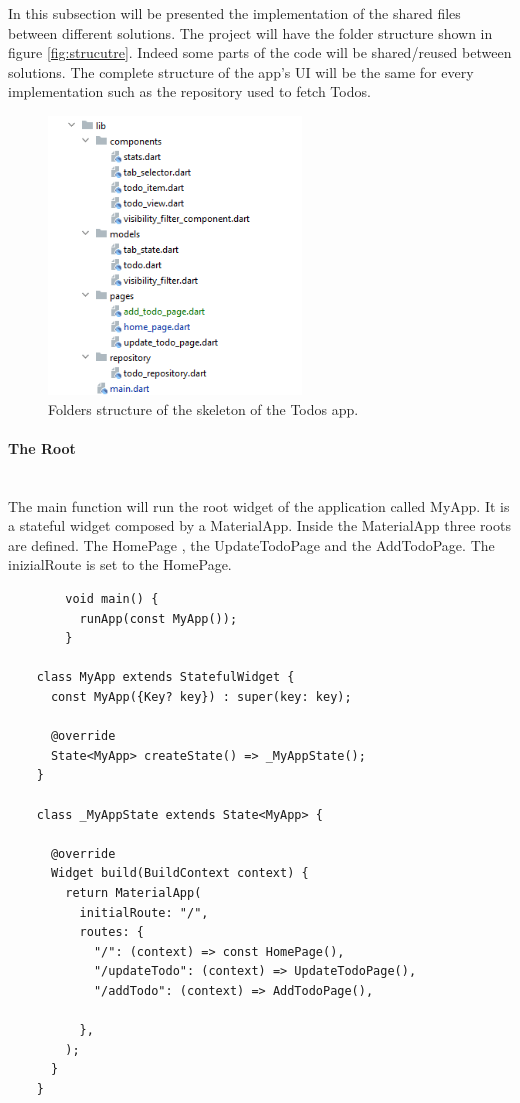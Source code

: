 	
	In this subsection will be presented the implementation of the shared files between different solutions. The project will have the folder structure shown in figure \ref{fig:strucutre}. Indeed some parts of the code will be shared/reused between solutions. The complete structure of the app’s UI will be the same for every implementation such as the repository used to fetch Todos. 
		
		\begin{figure}[H]
		    \centering
		    \includegraphics[width=0.6\textwidth]{Images/folder_structure.png}
		    \caption{Folders structure of the skeleton of the Todos app.}
		    \label{fig:shared_folder_structure_todo_app}
		\end{figure}
		
		\paragraph{The Root} \mbox{} \\
		\label{par:the_root_todo_app}
		The main function will run the root widget of the application called MyApp. It is a stateful widget composed by a MaterialApp. Inside the MaterialApp three roots are defined. The HomePage , the UpdateTodoPage and the AddTodoPage. The inizialRoute is set to the HomePage. 
		\mbox{}\\
		 \mbox{}
		\begin{verbatim}
		void main() {
		  runApp(const MyApp());
		}
	
	class MyApp extends StatefulWidget {
	  const MyApp({Key? key}) : super(key: key);
	
	  @override
	  State<MyApp> createState() => _MyAppState();
	}
	
	class _MyAppState extends State<MyApp> {
	
	  @override
	  Widget build(BuildContext context) {
	    return MaterialApp(
	      initialRoute: "/",
	      routes: {
	        "/": (context) => const HomePage(),
	        "/updateTodo": (context) => UpdateTodoPage(),
	        "/addTodo": (context) => AddTodoPage(),
	
	      },
	    );
	  }
	}
	
	\end{verbatim}
	
